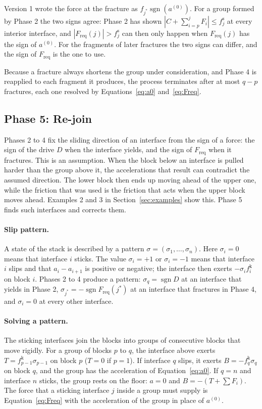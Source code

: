 \documentclass[11pt,a4paper]{article}
\newcommand{\fs}{f^{\mathrm{s}}}
\newcommand{\fkin}{f^{\mathrm{k}}}
\DeclareMathOperator{\sgn}{sgn}
\newcommand{\Freq}{F_{\mathrm{req}}}
\begin{document}
Version 1 wrote the force at the fracture as $f_{j^*}\sgn(a^{(0)})$. For a group formed by Phase 2 the two signs agree: Phase 2 has shown $|C+\sum_{i=p}^{j}F_i|\le \fs_j$ at every interior interface, and $|\Freq(j)|>\fs_j$ can then only happen when $\Freq(j)$ has the sign of $a^{(0)}$. For the fragments of later fractures the two signs can differ, and the sign of $\Freq$ is the one to use.

Because a fracture always shortens the group under consideration, and Phase 4 is reapplied to each fragment it produces, the process terminates after at most $q-p$ fractures, each one resolved by Equations~\eqref{eq:a0} and~\eqref{eq:Freq}.

\subsection{Phase 5: Re-join}\label{sec:phase5}

Phases 2 to 4 fix the sliding direction of an interface from the sign of a force: the sign of the drive $D$ when the interface yields, and the sign of $\Freq$ when it fractures. This is an assumption. When the block below an interface is pulled harder than the group above it, the accelerations that result can contradict the assumed direction. The lower block then ends up moving ahead of the upper one, while the friction that was used is the friction that acts when the upper block moves ahead. Examples 2 and 3 in Section~\ref{sec:examples} show this. Phase 5 finds such interfaces and corrects them.

\paragraph{Slip pattern.} A state of the stack is described by a pattern $\sigma=(\sigma_1,\dots,\sigma_n)$. Here $\sigma_i=0$ means that interface $i$ sticks. The value $\sigma_i=+1$ or $\sigma_i=-1$ means that interface $i$ slips and that $a_i-a_{i+1}$ is positive or negative; the interface then exerts $-\sigma_i\fkin_i$ on block $i$. Phases 2 to 4 produce a pattern: $\sigma_q=\sgn D$ at an interface that yields in Phase 2, $\sigma_{j^*}=-\sgn\Freq(j^*)$ at an interface that fractures in Phase 4, and $\sigma_i=0$ at every other interface.

\paragraph{Solving a pattern.} The sticking interfaces join the blocks into groups of consecutive blocks that move rigidly. For a group of blocks $p$ to $q$, the interface above exerts $T=\fkin_{p-1}\sigma_{p-1}$ on block $p$ ($T=0$ if $p=1$). If interface $q$ slips, it exerts $B=-\fkin_q\sigma_q$ on block $q$, and the group has the acceleration of Equation~\eqref{eq:a0}. If $q=n$ and interface $n$ sticks, the group rests on the floor: $a=0$ and $B=-(T+\sum F_i)$. The force that a sticking interface $j$ inside a group must supply is Equation~\eqref{eq:Freq} with the acceleration of the group in place of $a^{(0)}$.
\end{document}
